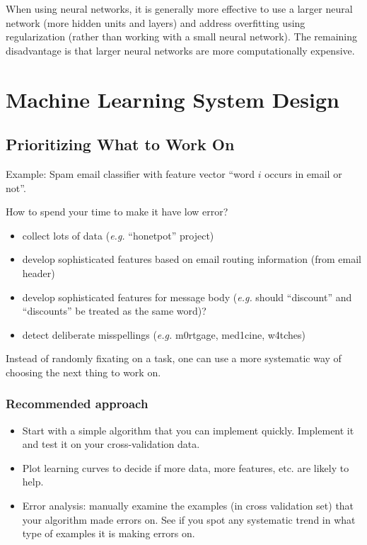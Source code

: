\documentclass[a4paper,twoside,10pt]{article}
\begin{document}
When using neural networks, it is generally more effective to use a larger neural network (more hidden units and layers) and address overfitting using regularization (rather than working with a small neural network).
The remaining disadvantage is that larger neural networks are more computationally expensive.

\section{Machine Learning System Design}
\subsection{Prioritizing What to Work On}
Example: Spam email classifier with feature vector ``word $i$ occurs in email or not''.

How to spend your time to make it have low error?
\begin{itemize}
  \item collect lots of data (\emph{e.g.} ``honetpot'' project)
  \item develop sophisticated features based on email routing information (from email header)
  \item develop sophisticated features for message body (\emph{e.g.} should ``discount'' and ``discounts'' be treated as the same word)?
  \item detect deliberate misspellings (\emph{e.g.} m0rtgage, med1cine, w4tches)
\end{itemize}
Instead of randomly fixating on a task, one can use a more systematic way of choosing the next thing to work on.

\subsubsection{Recommended approach}
\begin{itemize}
  \item Start with a simple algorithm that you can implement quickly. Implement it and test it on your cross-validation data.
  \item Plot learning curves to decide if more data, more features, etc. are likely to help.
  \item Error analysis: manually examine the examples (in cross validation set) that your algorithm made errors on.
    See if you spot any systematic trend in what type of examples it is making errors on.
\end{itemize}
\end{document}
